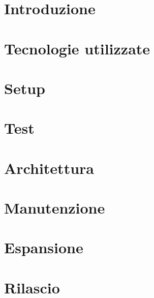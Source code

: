 \documentclass[]{article}
\begin{document}
	
	\newpage
	\tableofcontents
	\newpage
	\listoffigures
	\listoftables
	\newpage


	\section{Introduzione}
	
	\newpage

	\section{Tecnologie utilizzate}
	
	\newpage

	\section{Setup}
	
	\newpage

	\section{Test}
	
	\newpage

	\section{Architettura}
	
	\newpage

	\section{Manutenzione}
	
	\newpage
	
	\section{Espansione}
	
	\newpage
	
	\section{Rilascio}
	
	\newpage
	
\end{document}

